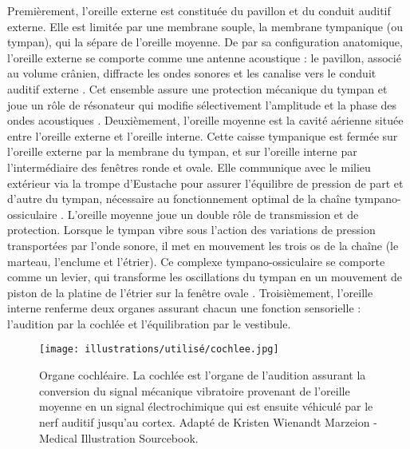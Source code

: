 Premièrement, l’oreille externe est constituée du pavillon et du conduit auditif externe. 
Elle est limitée par une membrane souple, la membrane tympanique (ou tympan), qui la sépare de l'oreille moyenne. 
De par sa configuration anatomique, l'oreille externe se comporte comme une antenne acoustique : le pavillon, associé au volume crânien, diffracte les ondes sonores et les canalise vers le conduit auditif externe \citep{isnard2016efficacite}. 
Cet ensemble assure une protection mécanique du tympan et joue un rôle de résonateur qui modifie sélectivement l'amplitude et la phase des ondes acoustiques \citep{albouy2013behavioral}. 
Deuxièmement, l’oreille moyenne est la cavité aérienne située entre l’oreille externe et l’oreille interne. 
Cette caisse tympanique est fermée sur l'oreille externe par la membrane du tympan, et sur l'oreille interne par l'intermédiaire des fenêtres ronde et ovale. 
Elle communique avec le milieu extérieur via la trompe d'Eustache pour assurer l'équilibre de pression de part et d'autre du tympan, nécessaire au fonctionnement optimal de la chaîne tympano-ossiculaire \citep{hasselmann2017codage}. 
L'oreille moyenne joue un double rôle de transmission et de protection. 
Lorsque le tympan vibre sous l'action des variations de pression transportées par l'onde sonore, il met en mouvement les trois os de la chaîne (le marteau, l’enclume et l’étrier). 
Ce complexe tympano-ossiculaire se comporte comme un levier, qui transforme les oscillations du tympan en un mouvement de piston de la platine de l'étrier sur la fenêtre ovale \citep{lorenzi2016audition}. 
Troisièmement, l'oreille interne renferme deux organes assurant chacun une fonction sensorielle : l’audition par la cochlée et l’équilibration par le vestibule. 

\begin{figure*}[!t]
\center
\texttt{[image: illustrations/utilisé/cochlee.jpg]}
\caption[Organe cochléaire]{Organe cochléaire. La cochlée est l'organe de l'audition assurant la conversion du signal mécanique vibratoire provenant de l'oreille moyenne en un signal électrochimique qui est ensuite véhiculé par le nerf auditif jusqu'au cortex. Adapté de Kristen Wienandt Marzeion - Medical Illustration Sourcebook.}
\label{fig:chap2cochlee}
\end{figure*}

